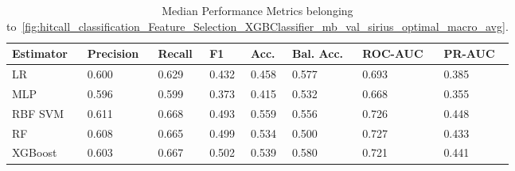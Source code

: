 \begin{longtable}{llllllll}
\caption{Median Performance Metrics belonging to~\ref{fig:hitcall_classification_Feature_Selection_XGBClassifier_mb_val_sirius_optimal_macro_avg}.}\label{tab:table:hitcall_classification_feature_selection_xgbclassifier_mb_val_sirius_optimal_macro_avg}\\
\toprule
\midrule
\small Estimator & \small Precision & \small Recall & \small F1 & \small Acc. & \small Bal. Acc. & \small ROC-AUC & \small PR-AUC\\
\hline
LR & 0.600 & 0.629 & 0.432 & 0.458 & 0.577 & 0.693 & 0.385\\
MLP & 0.596 & 0.599 & 0.373 & 0.415 & 0.532 & 0.668 & 0.355\\
RBF SVM & 0.611 & 0.668 & 0.493 & 0.559 & 0.556 & 0.726 & 0.448\\
RF & 0.608 & 0.665 & 0.499 & 0.534 & 0.500 & 0.727 & 0.433\\
XGBoost & 0.603 & 0.667 & 0.502 & 0.539 & 0.580 & 0.721 & 0.441\\
\bottomrule
\end{longtable}